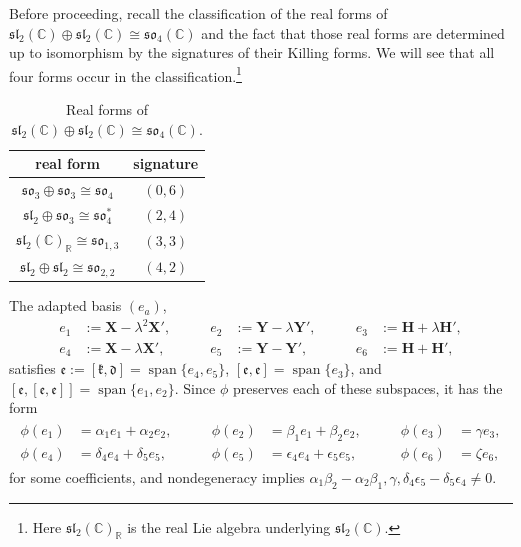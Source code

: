 \documentclass[pdftex]{sigma}
\DeclareMathOperator{\spanOperator}{span}
\newcommand{\Span}[1]{\spanOperator\{{#1}\}}
\newcommand{\bbC}{\mathbb{C}}
\newcommand{\bbR}{\mathbb{R}}
\newcommand{\mbH}{\mathbf{H}}
\newcommand{\mbX}{\mathbf{X}}
\newcommand{\mbY}{\mathbf{Y}}
\newcommand{\mfd} {\mathfrak{d}}
\newcommand{\mfe} {\mathfrak{e}}
\newcommand{\mfk} {\mathfrak{k}}
\newcommand{\mfsl} {\mathfrak{sl}}
\newcommand{\mfso} {\mathfrak{so}}
\numberwithin{equation}{section}
\begin{document}
Before proceeding, recall the classification of the real forms of $\mfsl_2(\bbC) \oplus \mfsl_2(\bbC) \cong \mfso_4(\bbC)$ and the fact that those real forms are determined up to isomorphism by the signatures of their Killing forms. We will see that all four forms occur in the classification.\footnote{Here $\mfsl_2(\bbC)_{\bbR}$ is the real Lie algebra underlying $\mfsl_2(\bbC)$.}

\begin{table}[htb]\small\centering
\caption{Real forms of $\mfsl_2(\bbC) \oplus \mfsl_2(\bbC) \cong \mfso_4(\bbC)$.}\label{table:real-forms-sl2C-sl2C}

\vspace{1mm}

\begin{tabular}{cc}
\toprule
 real form
 & signature \\
\midrule
	 $\mfso_3 \oplus \mfso_3 \cong \mfso_4$
 & $(0, 6)$ \\
	 $\mfsl_2 \oplus \mfso_3 \cong \mfso_4^*$
 & $(2, 4)$ \\
	 $\mfsl_2(\bbC)_{\bbR} \cong \mfso_{1, 3}$
 & $(3, 3)$ \\
	 $\mfsl_2 \oplus \mfsl_2 \cong \mfso_{2, 2}$
 & $(4, 2)$ \\
\bottomrule
\end{tabular}
\end{table}

The adapted basis $(e_a)$,
\begin{equation*}
\begin{alignedat}{3}
	 e_1 &:= \mbX - \lambda^2 \mbX' , \qquad
	&e_2 &:= \mbY - \lambda \mbY' , \qquad
	&e_3 &:= \mbH + \lambda \mbH' , \\
	 e_4 &:= \mbX - \lambda \mbX' , \qquad
	&e_5 &:= \mbY - \mbY' , \qquad
	&e_6 &:= \mbH + \mbH' ,
\end{alignedat}
\end{equation*}
satisfies $\mfe := [\mfk, \mfd] = \Span{e_4, e_5}$, $[\mfe, \mfe] = \Span{e_3}$, and $[\mfe, [\mfe, \mfe]] = \Span{e_1, e_2}$. Since $\phi$ preserves each of these subspaces, it has the form
\begin{gather}\label{equation:phi-D.6-lambda}
\begin{alignedat}{3}
	 \phi(e_1) &= \alpha_1 e_1 + \alpha_2 e_2, \qquad
	&\phi(e_2) &= \beta_1 e_1 + \beta_2 e_2, \qquad
	&\phi(e_3) &= \gamma e_3 , \\
	 \phi(e_4) &= \delta_4 e_4 + \delta_5 e_5, \qquad
	&\phi(e_5) &= \epsilon_4 e_4 + \epsilon_5 e_5, \qquad
	&\phi(e_6) &= \zeta e_6 ,
\end{alignedat}
\end{gather}
for some coefficients, and nondegeneracy implies $\alpha_1 \beta_2 - \alpha_2 \beta_1, \gamma, \delta_4 \epsilon_5 - \delta_5 \epsilon_4 \neq 0$.
\end{document}
